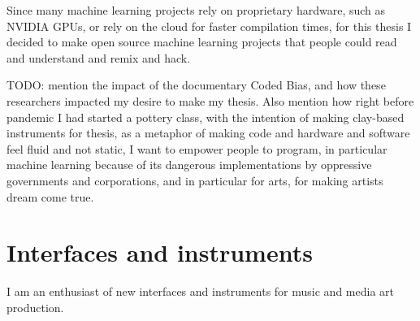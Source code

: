 Since many machine learning projects rely on proprietary hardware, such as NVIDIA GPUs, or rely on the cloud for faster compilation times, for this thesis I decided to make open source machine learning projects that people could read and understand and remix and hack.

TODO: mention the impact of the documentary Coded Bias, and how these researchers impacted my desire to make my thesis. Also mention how right before pandemic I had started a pottery class, with the intention of making clay-based instruments for thesis, as a metaphor of making code and hardware and software feel fluid and not static, I want to empower people to program, in particular machine learning because of its dangerous implementations by oppressive governments and corporations, and in particular for arts, for making artists dream come true.

\section{Interfaces and instruments}

I am an enthusiast of new interfaces and instruments for music and media art production.
